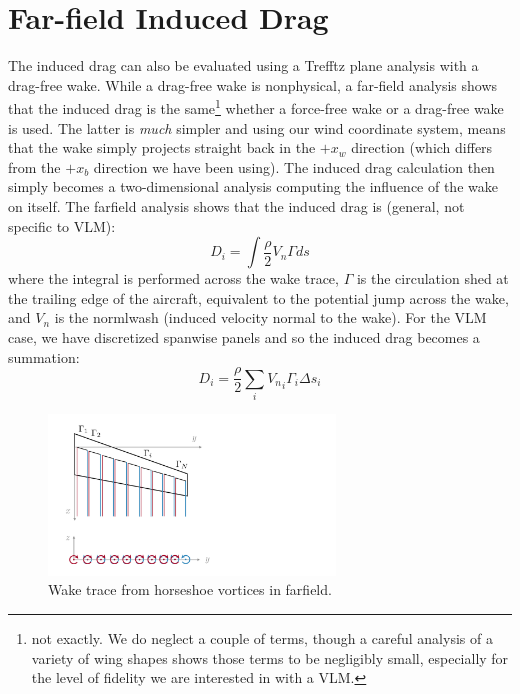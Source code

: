 \documentclass{article}
\begin{document}


\section{Far-field Induced Drag}

The induced drag can also be evaluated using a Trefftz plane analysis with a drag-free wake.  While a drag-free wake is nonphysical, a far-field analysis shows that the induced drag is the same\footnote{not exactly.  We do neglect a couple of terms, though a careful analysis of a variety of wing shapes shows those terms to be negligibly small, especially for the level of fidelity we are interested in with a VLM.} whether a force-free wake or a drag-free wake is used.  The latter is \emph{much} simpler and using our wind coordinate system, means that the wake simply projects straight back in the $+x_w$ direction (which differs from the $+x_b$ direction we have been using).  The induced drag calculation then simply becomes a two-dimensional analysis computing the influence of the wake on itself.  The farfield analysis shows that the induced drag is (general, not specific to VLM):
\begin{equation}
D_i = \int \frac{\rho}{2} V_n \Gamma ds
\end{equation}
where the integral is performed across the wake trace, $\Gamma$ is the circulation shed at the trailing edge of the aircraft, equivalent to the potential jump across the wake, and $V_n$ is the normlwash (induced velocity normal to the wake).  For the VLM case, we have discretized spanwise panels and so the induced drag becomes a summation:
\begin{equation}
D_i = \frac{\rho}{2} \sum_i  {V_n}_i \Gamma_i \Delta s_i
\label{eq:idrag}
\end{equation}

\begin{figure}[htbp]
\centering
\includegraphics[width=3.0in]{figs/vlmwake}
\caption{Wake trace from horseshoe vortices in farfield.}
\label{fig:vlmwake}
\end{figure}
\end{document}
